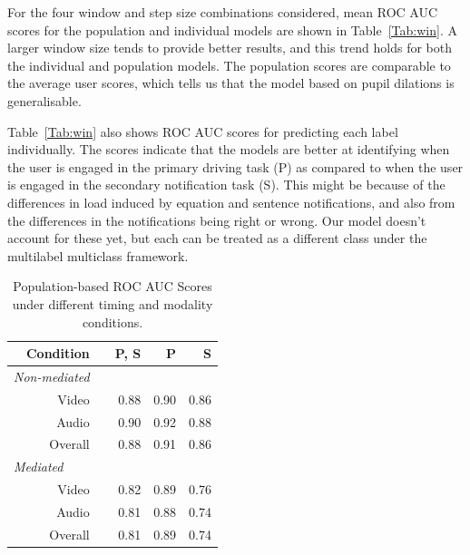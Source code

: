 For the four window and step size combinations considered, mean ROC AUC scores for the population and individual models are shown in Table~\ref{Tab:win}. A larger window size tends to provide better results, and this trend holds for both the individual and population models. The population scores are comparable to the average user scores, which tells us that the model based on pupil dilations is generalisable. 

Table~\ref{Tab:win} also shows ROC AUC scores for predicting each label individually. The scores indicate that the models are better at identifying when the user is engaged in the primary driving task (P) as compared to when the user is engaged in the secondary notification task (S). This might be because of the differences in load induced by equation and sentence notifications, and also from the differences in the notifications being right or wrong. Our model doesn't account for these yet, but each can be treated as a different class under the multilabel multiclass framework.


\begin{table}
\centering
\begin{tabular}{@{}rcrrr@{}}\toprule
Condition & \phantom{abc} & P, S & P & S\\
 \midrule
\multicolumn{1}{l}{\textit{Non-mediated \phantom{abcde}}} \\
 Video  && 0.88 & 0.90 & 0.86 \\
 Audio  && 0.90 & 0.92 & 0.88 \\
 Overall && 0.88 & 0.91 & 0.86 \\
\multicolumn{1}{l}{\textit{Mediated}} \\
 Video && 0.82 & 0.89 & 0.76 \\
 Audio && 0.81 & 0.88 & 0.74 \\
Overall && 0.81 & 0.89 & 0.74 \\
 \bottomrule
\end{tabular}
\caption{Population-based ROC AUC Scores under different timing and modality conditions.}
\label{Tab:NM}
\end{table}

